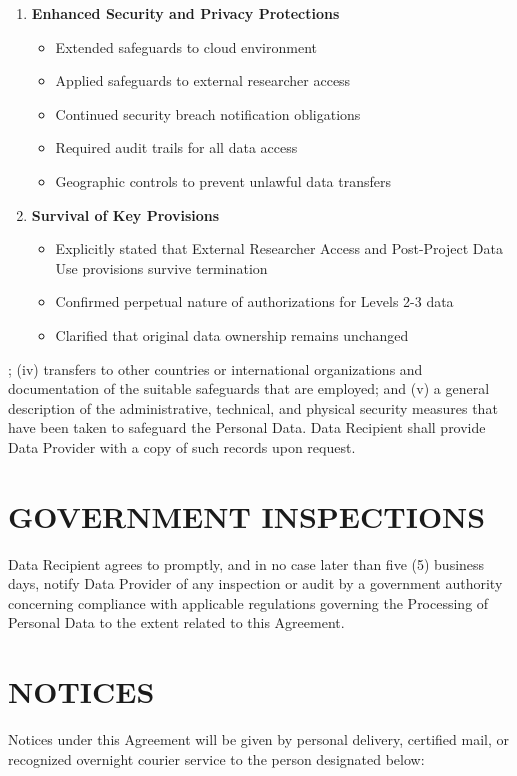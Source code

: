 {\begin{enumerate}
\begin{enumerate}
\item \textbf{Enhanced Security and Privacy Protections}
   \begin{itemize}
   \item Extended safeguards to cloud environment
   \item Applied safeguards to external researcher access
   \item Continued security breach notification obligations
   \item Required audit trails for all data access
   \item Geographic controls to prevent unlawful data transfers
   \end{itemize}

\item \textbf{Survival of Key Provisions}
   \begin{itemize}
   \item Explicitly stated that External Researcher Access and Post-Project Data Use provisions survive termination
   \item Confirmed perpetual nature of authorizations for Levels 2-3 data
   \item Clarified that original data ownership remains unchanged
   \end{itemize}
\end{enumerate}

; (iv) transfers to other countries or international organizations and documentation of the suitable safeguards that are employed; and (v) a general description of the administrative, technical, and physical security measures that have been taken to safeguard the Personal Data. Data Recipient shall provide Data Provider with a copy of such records upon request.

\section{GOVERNMENT INSPECTIONS}

Data Recipient agrees to promptly, and in no case later than five (5) business days, notify Data Provider of any inspection or audit by a government authority concerning compliance with applicable regulations governing the Processing of Personal Data to the extent related to this Agreement.

\section{NOTICES}

Notices under this Agreement will be given by personal delivery, certified mail, or recognized overnight courier service to the person designated below:


\end{enumerate}}
